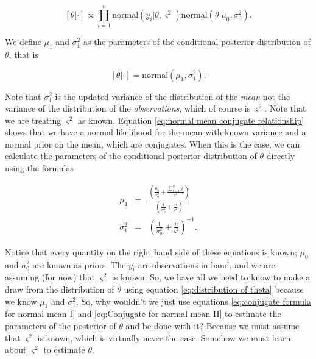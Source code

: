 \documentclass[11pt]{article}
\begin{document}
\begin{equation}
\left[\theta|\cdot\right]\propto\prod_{i=1}^{n}\text{normal}\left(y_{i}|\theta,\varsigma^{2}\right)\text{normal}\left(\theta|\mu_{0},\sigma_{0}^{2}\right).\label{eq:normal mean conjugate relationship}
\end{equation}

We define $\mu_{1}$ and $\sigma_{1}^{2}$ as the parameters of the conditional posterior distribution of $\theta$, that is 

\begin{equation}
\left[\theta|\cdot\right]=\text{normal}(\mu_{1},\sigma_{1}^{2}).\label{eq:distribution of theta}
\end{equation}

Note that $\sigma_{1}^{2}$ is the updated variance of the distribution of the \emph{mean} not the variance of the distribution of the \emph{observations}, which of course is $\varsigma^{2}$. Note that we are treating $\varsigma^{2}$ as known. Equation \ref{eq:normal mean conjugate relationship} shows that we have a normal likelihood for the mean with known variance and a normal prior on the mean, which are conjugates. When this is the case, we can calculate the parameters of the conditional posterior distribution of $\theta$ directly using the formulas

\begin{eqnarray}
\mu_{1} & = & \frac{\left(\frac{\mu_{0}}{\sigma_{0}^{2}}+\frac{\sum_{i=1}^{n}y_{i}}{\varsigma^{2}}\right)}{\left(\frac{1}{\sigma_{0}^{2}}+\frac{n}{\varsigma^{2}}\right)}\label{eq:conjugate formula for normal mean I}\\
\sigma_{1}^{2} & = & \left(\frac{1}{\sigma_{0}^{2}}+\frac{n}{\varsigma^{2}}\right)^{-1}.\label{eq:Conjugate for normal mean II}
\end{eqnarray}

Notice that every quantity on the right hand side of these equations is known; $\mu_{0}$ and $\sigma_{0}^{2}$ are known as priors. The $y_{i}$ are observations in hand, and we are assuming (for now) that $\varsigma^{2}$ is known. So, we have all we need to know to make a draw from the distribution of $\theta$ using equation \ref{eq:distribution of theta}
because we know $\mu_{1}$ and $\sigma_{1}^{2}$. So, why wouldn't we just use equations $ $\ref{eq:conjugate formula for normal mean I} and \ref{eq:Conjugate for normal mean II} to estimate the parameters of the posterior of $\theta$ and be done with it? Because we must assume that $\varsigma^{2}$ is known, which is virtually never the case. Somehow we must learn about $\varsigma^{2}$ to estimate $\theta$.
\end{document}
